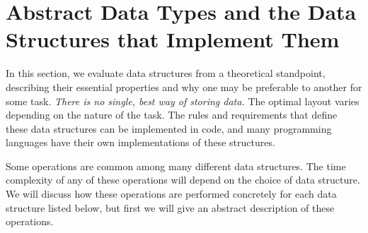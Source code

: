 \chapter{Abstract Data Types and the Data Structures that Implement Them}

In this section, we evaluate data structures from a theoretical standpoint, describing their essential properties and why one may be preferable to another for some task. \textit{There is no single, best way of storing data.} The optimal layout varies depending on the nature of the task. The rules and requirements that define these data structures can be implemented in code, and many programming languages have their own implementations of these structures.

Some operations are common among many different data structures. The time complexity of any of these operations will depend on the choice of data structure. We will discuss how these operations are performed concretely for each data structure listed below, but first we will give an abstract description of these operations.

